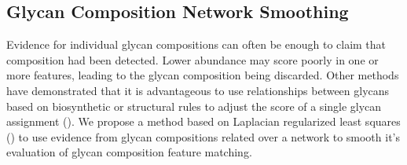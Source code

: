 \subsection{Glycan Composition Network Smoothing}
    Evidence for individual glycan compositions can often be enough to claim
    that composition had been detected. Lower abundance may score poorly in one
    or more features, leading to the glycan composition being discarded. Other
    methods have demonstrated that it is advantageous to use relationships between
    glycans based on biosynthetic or structural rules to adjust the score of a
    single glycan assignment (\cite{Goldberg2009, Kronewitter2014}). We propose
    a method based on Laplacian regularized least squares (\cite{Belkin2006}) to
    use evidence from glycan compositions related over a network to smooth it's
    evaluation of glycan composition feature matching.

    

    

    

    